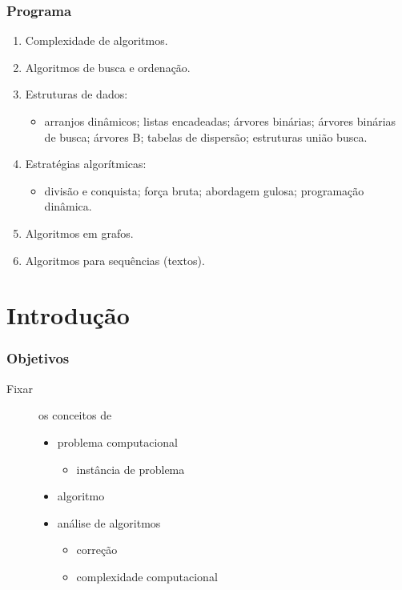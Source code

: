 \documentclass{beamer}
\begin{document}
\begin{frame}

  \frametitle{Programa}

  \begin{enumerate}
    \item Complexidade de algoritmos.
    \item Algoritmos de busca e ordenação.
    \item Estruturas de dados:
      \begin{itemize}
        \item arranjos dinâmicos; listas encadeadas; árvores binárias;
          árvores binárias de busca; árvores B; tabelas de dispersão;
          estruturas união busca.
      \end{itemize}
    \item Estratégias algorítmicas:
      \begin{itemize}
        \item divisão e conquista; força bruta; abordagem gulosa; programação dinâmica.
      \end{itemize}
    \item Algoritmos em grafos.
    \item Algoritmos para sequências (textos).
  \end{enumerate}
\end{frame}

\section{Introdução}

\begin{frame}

  \frametitle{Objetivos}

  \begin{description}
  \item[Fixar] os conceitos de 
    \begin{itemize}
      \item problema computacional
        \begin{itemize}
          \item instância de problema
        \end{itemize}
      \item algoritmo
      \item análise de algoritmos
        \begin{itemize}
          \item correção
          \item complexidade computacional
        \end{itemize}
    \end{itemize}
  \end{description}

\end{frame}
\end{document}
